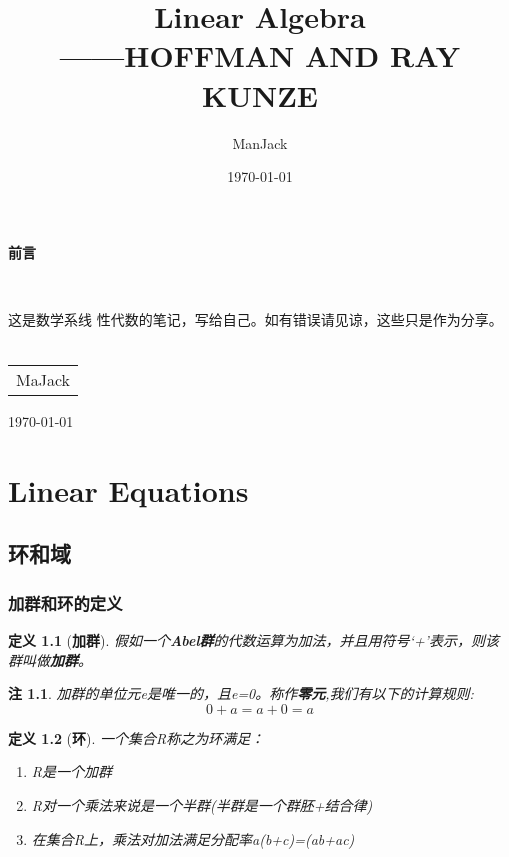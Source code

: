 \documentclass[11pt, a4paper, oneside,UTF8]{ctexbook}
\title{{\Huge{\textbf{Linear Algebra}}}\\------HOFFMAN AND RAY KUNZE}
\author{ManJack}
\date{\today}
\newtheorem{definition}{\indent 定义}[section]
\newtheorem{remark}{\indent 注}[section]
\begin{document}
\maketitle

\setcounter{page}{1}
\newpage
\begin{center}
	\Huge\textbf{前言}
\end{center}~\

这是数学系线      性代数的笔记，写给自己。如有错误请见谅，这些只是作为分享。
~\\
\begin{flushright}
	\begin{tabular}{c}
		MaJack \\
	\end{tabular}
\end{flushright}

\newpage
{}
\setcounter{page}{1}
\today
\tableofcontents
\newpage
\setcounter{page}{1}
\chapter{Linear Equations}
\section{环和域}
\subsection{加群和环的定义}
\begin{definition}[\textbf{加群}]
	假如一个\textbf{Abel群}的代数运算为加法，并且用符号‘+’表示，则该群叫做\textbf{加群}。

\end{definition}

\begin{remark}
	加群的单位元e是唯一的，且e=0。称作\textbf{零元},我们有以下的计算规则:
	\[
		0+a=a+0=a
	\]
\end{remark}

\begin{definition}[\textbf{环}]
	一个集合R称之为环满足：
	\begin{enumerate}
		\item R是一个加群
		\item R对一个乘法来说是一个半群(半群是一个群胚+结合律)
		\item 在集合R上，乘法对加法满足分配率a(b+c)=(ab+ac)
	\end{enumerate}
\end{definition}
\end{document}
